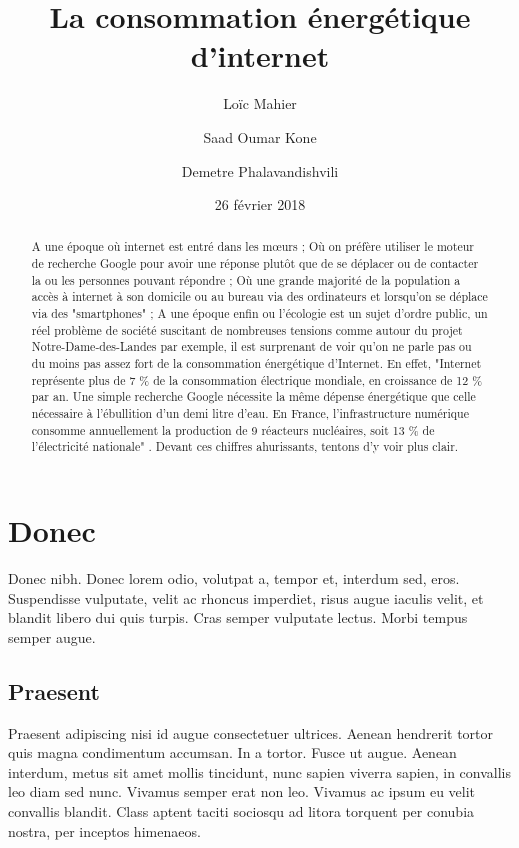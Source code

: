 \documentclass[a4paper,twocolumn,10pt]{article}
\title{\Huge \bfseries La consommation énergétique d'internet}
\author{Loïc Mahier \and Saad Oumar Kone \and Demetre Phalavandishvili}
\date{26 février 2018}
\begin{document}
\maketitle

\begin{abstract}

A une époque où internet est entré dans les mœurs ; Où on préfère utiliser le moteur de recherche Google pour avoir une réponse plutôt que de se déplacer ou de contacter la ou les personnes pouvant répondre ; Où une grande majorité de la population a accès à internet à son domicile ou au bureau via des ordinateurs et lorsqu'on se déplace via des "smartphones" ; A une époque enfin ou l'écologie est un sujet d'ordre public, un réel problème de société suscitant de nombreuses tensions comme autour du projet Notre-Dame-des-Landes par exemple, il est surprenant de voir qu'on ne parle pas ou du moins pas assez fort de la consommation énergétique d'Internet. En effet, "Internet représente plus de 7 \% de la consommation électrique mondiale, en croissance de 12 \% par an. Une simple recherche Google nécessite la même dépense énergétique que celle nécessaire à l’ébullition d’un demi litre d’eau. En France, l’infrastructure numérique consomme annuellement la production de 9 réacteurs nucléaires, soit 13 \% de l’électricité nationale" \cite{1}. Devant ces chiffres ahurissants, tentons d'y voir plus clair.

\end{abstract}


\section*{Donec}

Donec nibh. Donec lorem odio, volutpat a, tempor et, interdum sed, eros.
Suspendisse vulputate, velit ac rhoncus imperdiet, risus augue iaculis velit, et
blandit libero dui quis turpis. Cras semper vulputate lectus. Morbi tempus
semper augue.

\subsection*{Praesent}

Praesent adipiscing nisi id augue consectetuer ultrices. Aenean hendrerit tortor
quis magna condimentum accumsan. In a tortor. Fusce ut augue. Aenean interdum,
metus sit amet mollis tincidunt, nunc sapien viverra sapien, in convallis leo
diam sed nunc. Vivamus semper erat non leo. Vivamus ac ipsum eu velit convallis
blandit. Class aptent taciti sociosqu ad litora torquent per conubia nostra, per
inceptos himenaeos.
\end{document}
